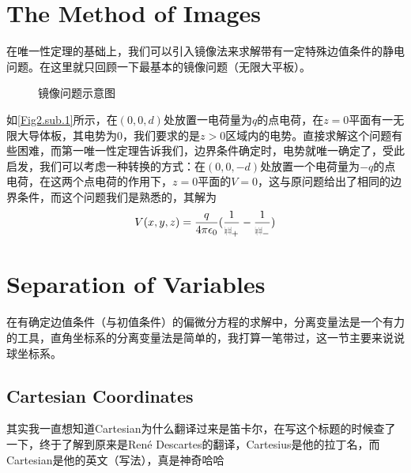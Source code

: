 \documentclass[14pt,oneside]{book}
\def\rr{{\mbox{$\resizebox{.09in}{.08in}{\texttt{[image: ScriptR]}}$}}}
\begin{document}
\begin{large}
\section{The Method of Images}
在唯一性定理的基础上，我们可以引入镜像法来求解带有一定特殊边值条件的静电问题。在这里就只回顾一下最基本的镜像问题（无限大平板）。
\begin{figure}[H]
\centering  %
\caption{镜像问题示意图}
\label{Fig2.main}
\end{figure}
如\ref{Fig2.sub.1}所示，在$(0,0,d)$处放置一电荷量为$	q$的点电荷，在$z=0$平面有一无限大导体板，其电势为0，我们要求的是$z>0$区域内的电势。直接求解这个问题有些困难，而第一唯一性定理告诉我们，边界条件确定时，电势就唯一确定了，受此启发，我们可以考虑一种转换的方式：在$(0,0,-d)$处放置一个电荷量为$-q$的点电荷，在这两个点电荷的作用下，$z=0$平面的$V=0$，这与原问题给出了相同的边界条件，而这个问题我们是熟悉的，其解为
\begin{equation}
  V(x,y,z)=\frac{q}{4\pi\epsilon_0}(\frac{1}{\rr_+}-\frac{1}{\rr_-})
\end{equation}

\section{Separation of Variables }

在有确定边值条件（与初值条件）的偏微分方程的求解中，分离变量法是一个有力的工具，直角坐标系的分离变量法是简单的，我打算一笔带过，这一节主要来说说球坐标系。
\subsection{Cartesian Coordinates}
其实我一直想知道Cartesian为什么翻译过来是笛卡尔，在写这个标题的时候查了一下，终于了解到原来是René Descartes的翻译，Cartesius是他的拉丁名，而Cartesian是他的英文（写法），真是神奇哈哈


\end{large}
\end{document}
